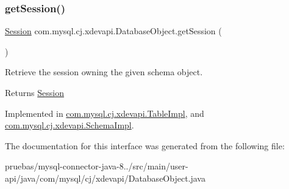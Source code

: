 \mbox{\label{interfacecom_1_1mysql_1_1cj_1_1xdevapi_1_1_database_object_a0bebc7132108a9cfcffed4a599b2dad5}} 
\subsubsection{\texorpdfstring{get\+Session()}{getSession()}}
{\footnotesize\ttfamily \mbox{\hyperlink{interfacecom_1_1mysql_1_1cj_1_1xdevapi_1_1_session}{Session}} com.\+mysql.\+cj.\+xdevapi.\+Database\+Object.\+get\+Session (\begin{DoxyParamCaption}{ }\end{DoxyParamCaption})}

Retrieve the session owning the given schema object.

\begin{DoxyReturn}{Returns}
\mbox{\hyperlink{interfacecom_1_1mysql_1_1cj_1_1xdevapi_1_1_session}{Session}} 
\end{DoxyReturn}


Implemented in \mbox{\hyperlink{classcom_1_1mysql_1_1cj_1_1xdevapi_1_1_table_impl_a50a4a5d8827aef7156fe6aa564f8809a}{com.\+mysql.\+cj.\+xdevapi.\+Table\+Impl}}, and \mbox{\hyperlink{classcom_1_1mysql_1_1cj_1_1xdevapi_1_1_schema_impl_ab09abc096390ec7f763d045636551b7f}{com.\+mysql.\+cj.\+xdevapi.\+Schema\+Impl}}.



The documentation for this interface was generated from the following file\+:\begin{DoxyCompactItemize}
\item 
pruebas/mysql-\/connector-\/java-\/8../src/main/user-\/api/java/com/mysql/cj/xdevapi/Database\+Object.\+java\end{DoxyCompactItemize}
